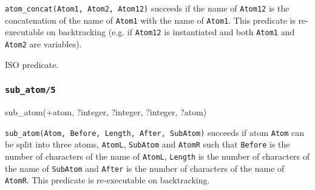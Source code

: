 \Description

\texttt{atom\_concat(Atom1, Atom2, Atom12)} succeeds if the name of
\texttt{Atom12} is the concatenation of the name of \texttt{Atom1} with the
name of \texttt{Atom1}. This predicate is re-executable on backtracking
(e.g. if \texttt{Atom12} is instantiated and both \texttt{Atom1} and
\texttt{Atom2} are variables).

\begin{PlErrors}






\end{PlErrors}

\Portability

ISO predicate.

\subsubsection{\texttt{sub\_atom/5}}

\begin{TemplatesOneCol}
sub\_atom(+atom, ?integer, ?integer, ?integer, ?atom)

\end{TemplatesOneCol}

\Description

\texttt{sub\_atom(Atom, Before, Length, After, SubAtom)} succeeds if atom
\texttt{Atom} can be split into three atoms, \texttt{AtomL},
\texttt{SubAtom} and \texttt{AtomR} such that \texttt{Before} is the number
of characters of the name of \texttt{AtomL}, \texttt{Length} is the number
of characters of the name of \texttt{SubAtom} and \texttt{After} is the
number of characters of the name of \texttt{AtomR}. This predicate is
re-executable on backtracking.

